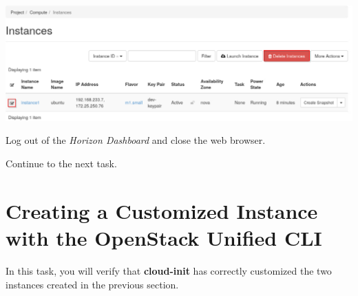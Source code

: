 \documentclass[letterpaper, 12pt]{article}
\begin{document}
\begin{enumerate}
\begin{labstep}
        \begin{center}
            \includegraphics[width=\linewidth]{images/part2/step16.png}
        \end{center}
    \end{labstep}

    \begin{labstep}
        Log out of the \textit{Horizon Dashboard} and close the web browser.
    \end{labstep}

    \begin{labstep}
        Continue to the next task.
    \end{labstep}

\end{enumerate}

\section{Creating a Customized Instance with the OpenStack Unified CLI}\label{sec:creating_a_customized_instance_using_the_openstack_unified_cli}
In this task, you will verify that \textbf{cloud-init} has correctly customized the two instances created in the previous section.
\end{document}
